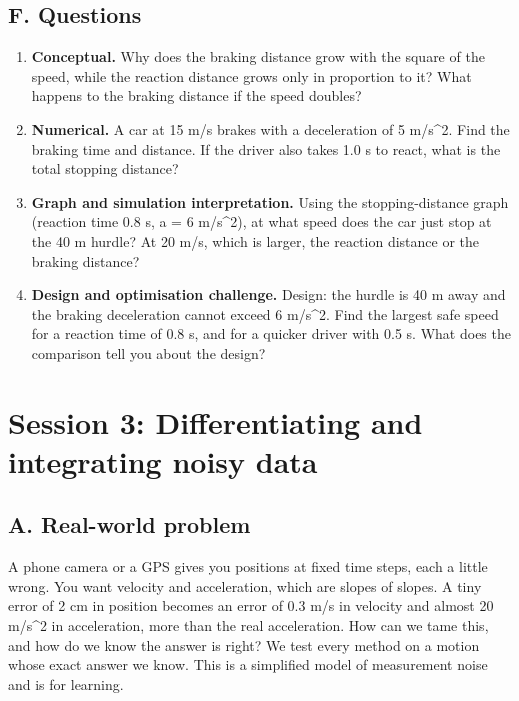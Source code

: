 \documentclass[11pt,a4paper]{article}
\begin{document}
\subsection*{F. Questions}
\begin{enumerate}[nosep]
\item \textbf{Conceptual.} Why does the braking distance grow with the square of the speed, while the reaction distance grows only in proportion to it? What happens to the braking distance if the speed doubles?
\item \textbf{Numerical.} A car at 15 m/s brakes with a deceleration of 5 m/s\textasciicircum{}2. Find the braking time and distance. If the driver also takes 1.0 s to react, what is the total stopping distance?
\item \textbf{Graph and simulation interpretation.} Using the stopping-distance graph (reaction time 0.8 s, a = 6 m/s\textasciicircum{}2), at what speed does the car just stop at the 40 m hurdle? At 20 m/s, which is larger, the reaction distance or the braking distance?
\item \textbf{Design and optimisation challenge.} Design: the hurdle is 40 m away and the braking deceleration cannot exceed 6 m/s\textasciicircum{}2. Find the largest safe speed for a reaction time of 0.8 s, and for a quicker driver with 0.5 s. What does the comparison tell you about the design?
\end{enumerate}

\section{Session 3: Differentiating and integrating noisy data}

\subsection*{A. Real-world problem}
A phone camera or a GPS gives you positions at fixed time steps, each a little wrong. You want velocity and acceleration, which are slopes of slopes. A tiny error of 2 cm in position becomes an error of 0.3 m/s in velocity and almost 20 m/s\textasciicircum{}2 in acceleration, more than the real acceleration. How can we tame this, and how do we know the answer is right? We test every method on a motion whose exact answer we know. This is a simplified model of measurement noise and is for learning.
\end{document}
